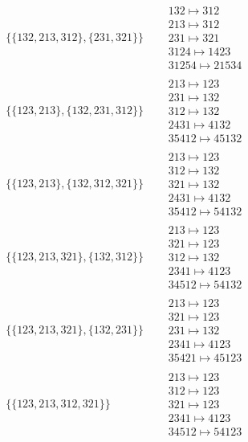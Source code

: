 \begin{tiny}
\begin{align}
\begin{matrix}
\end{matrix}
\\
\{\{132, 213, 312\}, \{231, 321\}\}
\quad
&
\begin{matrix}
132 \mapsto 312\\213 \mapsto 312\\231 \mapsto 321\\3124 \mapsto 1423\\31254 \mapsto 21534
\end{matrix}
\\
\{\{123, 213\}, \{132, 231, 312\}\}
\quad
&
\begin{matrix}
213 \mapsto 123\\231 \mapsto 132\\312 \mapsto 132\\2431 \mapsto 4132\\35412 \mapsto 45132
\end{matrix}
\\
\{\{123, 213\}, \{132, 312, 321\}\}
\quad
&
\begin{matrix}
213 \mapsto 123\\312 \mapsto 132\\321 \mapsto 132\\2431 \mapsto 4132\\35412 \mapsto 54132
\end{matrix}
\\
\{\{123, 213, 321\}, \{132, 312\}\}
\quad
&
\begin{matrix}
213 \mapsto 123\\321 \mapsto 123\\312 \mapsto 132\\2341 \mapsto 4123\\34512 \mapsto 54132
\end{matrix}
\\
\{\{123, 213, 321\}, \{132, 231\}\}
\quad
&
\begin{matrix}
213 \mapsto 123\\321 \mapsto 123\\231 \mapsto 132\\2341 \mapsto 4123\\35421 \mapsto 45123
\end{matrix}
\\
\{\{123, 213, 312, 321\}\}
\quad
&
\begin{matrix}
213 \mapsto 123\\312 \mapsto 123\\321 \mapsto 123\\2341 \mapsto 4123\\34512 \mapsto 54123

\end{matrix}
\end{align}
\end{tiny}
